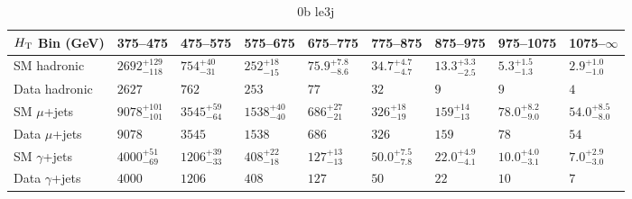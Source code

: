 \documentclass[8pt]{article}
\def\scalht{\mbox{$H_{\rm{T}}$}\xspace}
\newcommand\T{\rule{0pt}{2.6ex}}
\newcommand\B{\rule[-1.2ex]{0pt}{0pt}}
\begin{document}
\begin{table}[ht!]
\caption{0b le3j}
\label{tab:ensemble-0b le3j}
\centering
\begin{tabular}{ lllllllll }

\hline
\scalht Bin (GeV)       & 375--475                       & 475--575                       & 575--675                       & 675--775                       & 775--875                       & 875--975                       & 975--1075                      & 1075--$\infty$                 \\ [1.000000ex]
\hline
SM hadronic\T           & $2692^{+129}_{-118}$           & $754^{+40}_{-31}$              & $252^{+18}_{-15}$              & $75.9^{+7.8}_{-8.6}$           & $34.7^{+4.7}_{-4.7}$           & $13.3^{+3.3}_{-2.5}$           & $5.3^{+1.5}_{-1.3}$            & $2.9^{+1.0}_{-1.0}$            \\ 
Data hadronic\B         & $2627$                         & $762$                          & $253$                          & $77$                           & $32$                           & $9$                            & $9$                            & $4$                            \\ 
\hline
SM $\mu$+jets\T         & $9078^{+101}_{-101}$           & $3545^{+59}_{-64}$             & $1538^{+40}_{-40}$             & $686^{+27}_{-21}$              & $326^{+18}_{-19}$              & $159^{+14}_{-13}$              & $78.0^{+8.2}_{-9.0}$           & $54.0^{+8.5}_{-8.0}$           \\ 
Data $\mu$+jets\B       & $9078$                         & $3545$                         & $1538$                         & $686$                          & $326$                          & $159$                          & $78$                           & $54$                           \\ 
\hline
SM $\gamma$+jets\T      & $4000^{+51}_{-69}$             & $1206^{+39}_{-33}$             & $408^{+22}_{-18}$              & $127^{+13}_{-13}$              & $50.0^{+7.5}_{-7.8}$           & $22.0^{+4.9}_{-4.1}$           & $10.0^{+4.0}_{-3.1}$           & $7.0^{+2.9}_{-3.0}$            \\ 
Data $\gamma$+jets\B    & $4000$                         & $1206$                         & $408$                          & $127$                          & $50$                           & $22$                           & $10$                           & $7$                            \\ 
\hline

\end{tabular}
\end{table}
\end{document}
